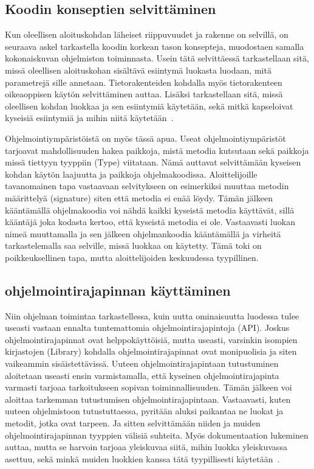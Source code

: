\documentclass[finnish]{../tktltiki2}
\theoremstyle{definition}
\theoremstyle{remark}
\begin{document}
\subsection{Koodin konseptien selvittäminen}
Kun oleellisen aloituskohdan läheiset riippuvuudet ja rakenne on selvillä, on seuraava askel tarkastella koodin korkean tason konsepteja, muodostaen samalla kokonaiskuvan ohjelmiston toiminnasta. Usein tätä selvittäessä tarkastellaan sitä, missä oleellisen aloituskohan sisältävä esiintymä luokasta luodaan, mitä parametrejä sille annetaan. Tietorakenteiden kohdalla myös tietorakenteen oikeaoppisen käytön selvittäminen auttaa. Lisäksi tarkastellaan sitä, missä oleellisen kohdan luokkaa ja sen esiintymiä käytetään, sekä mitkä kapseloivat kyseisiä esiintymiä ja mihin niitä käytetään~\cite{questions-during-software-evolution-tasks,eliciting-design-requirements-for-maintenance-oriented-ides}.

Ohjelmointiympäristöistä on myös tässä apua. Useat ohjelmointiympäristöt tarjoavat mahdollisuuden hakea paikkoja, mistä metodia kutsutaan sekä paikkoja missä tiettyyn tyyppiin (Type) viitataan. Nämä auttavat selvittämään kyseisen kohdan käytön laajuutta ja paikkoja ohjelmakoodissa. Aloittelijoille tavanomainen tapa vastaavaan selvitykseen on esimerkiksi muuttaa metodin määrittelyä (signature) siten että metodia ei enää löydy. Tämän jälkeen kääntämällä ohjelmakoodia voi nähdä kaikki kyseistä metodia käyttävät, sillä kääntäjä joka kodasta kertoo, että kyseistä metodia ei ole. Vastaavasti luokan nimeä muuttamalla ja sen jälkeen ohjelmankoodia kääntämällä ja virheitä tarkastelemalla saa selville, missä luokkaa on käytetty. Tämä toki on poikkeuksellinen tapa, mutta aloittelijoiden keskuudessa tyypillinen.

\subsection{ohjelmointirajapinnan käyttäminen}
Niin ohjelman toimintaa tarkastellessa, kuin uutta ominaisuutta luodessa tulee useasti vastaan ennalta tuntemattomia ohjelmointirajapintoja (API). Joskus ohjelmointirajapinnat ovat helppokäyttöisiä, mutta useasti, varsinkin isompien kirjastojen (Library) kohdalla ohjelmointirajapinnat ovat monipuolisia ja siten vaikeammin sisäistettävissä.
Uuteen ohjelmointirajapintaan tutustuminen aloitetaan useasti ensin varmistamalla, että kyseinen ohjelmointirajapinta varmasti tarjoaa tarkoitukseen sopivan toiminnallisuuden. Tämän jälkeen voi aloittaa tarkemman tutustumisen ohjelmointirajapintaan.
Vastaavasti, kuten uuteen ohjelmistoon tutustuttaessa, pyritään aluksi paikantaa ne luokat ja metodit, jotka ovat tarpeen. Ja sitten selvittämään niiden ja muiden ohjelmointirajapinnan tyyppien välisiä suhteita. Myös dokumentaation lukeminen auttaa, mutta se harvoin tarjoaa yleiskuvaa siitä, mihin luokka yleiskuvassa asettuu, sekä minkä muiden luokkien kanssa tätä tyypillisesti käytetään~\cite{asking-and-answering-api-questions}.
\end{document}
